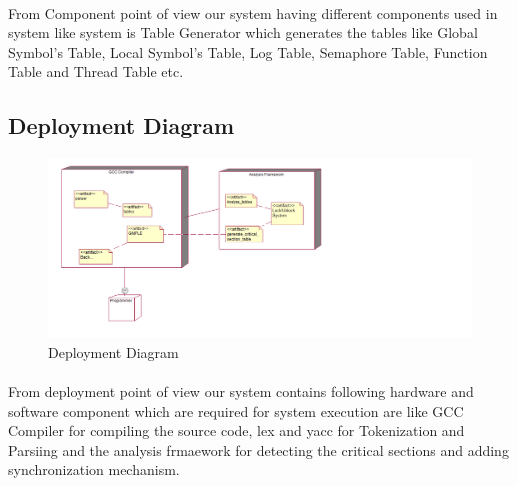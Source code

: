 \paragraph{}
From Component point of view our system having different components used in system like system is Table Generator which generates the tables like Global Symbol's Table, Local Symbol's Table, Log Table, Semaphore Table, Function Table and Thread Table etc.

\subsection{Deployment Diagram}
\begin{figure}[H]
\centering
\includegraphics[scale=0.6]{deployment.png}
\caption{Deployment Diagram}
\label{<<Label>>}
\end{figure}
\paragraph{}
From deployment point of view our system contains following hardware and software component which are required for system execution are like GCC Compiler for compiling the source code, lex and yacc for Tokenization and Parsiing and the analysis frmaework for detecting the critical sections and adding synchronization mechanism.
